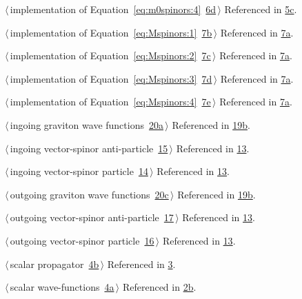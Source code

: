 \documentclass[a4paper,12pt]{amsart}
\renewcommand{\NWlink}[2]{\hyperlink{#1}{#2}}
\renewcommand{\NWtxtRefIn}{Referenced in}
\begin{document}
{\begin{list}{}{\setlength{\itemsep}{-\parsep}\setlength{\itemindent}{-\leftmargin}}
\item $\langle\,$implementation of Equation~\eqref{eq:m0spinors:4}\nobreak\ {\footnotesize \NWlink{nuweb6d}{6d}}$\,\rangle$ {\footnotesize {\NWtxtRefIn} \NWlink{nuweb5c}{5c}.}
\item $\langle\,$implementation of Equation~\eqref{eq:Mspinors:1}\nobreak\ {\footnotesize \NWlink{nuweb7b}{7b}}$\,\rangle$ {\footnotesize {\NWtxtRefIn} \NWlink{nuweb7a}{7a}.}
\item $\langle\,$implementation of Equation~\eqref{eq:Mspinors:2}\nobreak\ {\footnotesize \NWlink{nuweb7c}{7c}}$\,\rangle$ {\footnotesize {\NWtxtRefIn} \NWlink{nuweb7a}{7a}.}
\item $\langle\,$implementation of Equation~\eqref{eq:Mspinors:3}\nobreak\ {\footnotesize \NWlink{nuweb7d}{7d}}$\,\rangle$ {\footnotesize {\NWtxtRefIn} \NWlink{nuweb7a}{7a}.}
\item $\langle\,$implementation of Equation~\eqref{eq:Mspinors:4}\nobreak\ {\footnotesize \NWlink{nuweb7e}{7e}}$\,\rangle$ {\footnotesize {\NWtxtRefIn} \NWlink{nuweb7a}{7a}.}
\item $\langle\,$ingoing graviton wave functions\nobreak\ {\footnotesize \NWlink{nuweb20a}{20a}}$\,\rangle$ {\footnotesize {\NWtxtRefIn} \NWlink{nuweb19b}{19b}.}
\item $\langle\,$ingoing vector-spinor anti-particle\nobreak\ {\footnotesize \NWlink{nuweb15}{15}}$\,\rangle$ {\footnotesize {\NWtxtRefIn} \NWlink{nuweb13}{13}.}
\item $\langle\,$ingoing vector-spinor particle\nobreak\ {\footnotesize \NWlink{nuweb14}{14}}$\,\rangle$ {\footnotesize {\NWtxtRefIn} \NWlink{nuweb13}{13}.}
\item $\langle\,$outgoing graviton wave functions\nobreak\ {\footnotesize \NWlink{nuweb20c}{20c}}$\,\rangle$ {\footnotesize {\NWtxtRefIn} \NWlink{nuweb19b}{19b}.}
\item $\langle\,$outgoing vector-spinor anti-particle\nobreak\ {\footnotesize \NWlink{nuweb17}{17}}$\,\rangle$ {\footnotesize {\NWtxtRefIn} \NWlink{nuweb13}{13}.}
\item $\langle\,$outgoing vector-spinor particle\nobreak\ {\footnotesize \NWlink{nuweb16}{16}}$\,\rangle$ {\footnotesize {\NWtxtRefIn} \NWlink{nuweb13}{13}.}
\item $\langle\,$scalar propagator\nobreak\ {\footnotesize \NWlink{nuweb4b}{4b}}$\,\rangle$ {\footnotesize {\NWtxtRefIn} \NWlink{nuweb3}{3}.}
\item $\langle\,$scalar wave-functions\nobreak\ {\footnotesize \NWlink{nuweb4a}{4a}}$\,\rangle$ {\footnotesize {\NWtxtRefIn} \NWlink{nuweb2b}{2b}.}

\end{list}}
\end{document}
